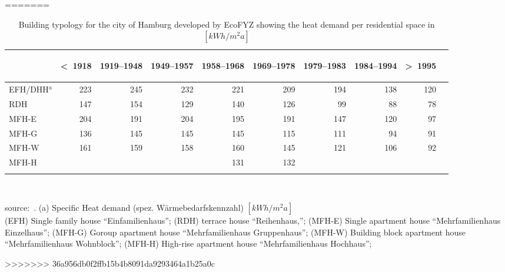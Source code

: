 =======
\begin{table}[htbp]
  \centering
  \caption{Building typology for the city of Hamburg developed by EcoFYZ
      showing the heat demand per residential space in
  $[kWh/m^2a]$}\label{tab:EcoFYZ}%
  \begin{tabular}{l r rrr rrr rr}
    \addlinespace
    \toprule
    &
    \begin{sideways}\textless~1918\end{sideways}&  %
    \begin{sideways}1919--1948\end{sideways}&     %
    \begin{sideways}1949--1957\end{sideways}&     %
    \begin{sideways}1958--1968\end{sideways}&     %
    \begin{sideways}1969--1978\end{sideways}&     %
    \begin{sideways}1979--1983\end{sideways}&     %
    \begin{sideways}1984--1994\end{sideways}&     %
    \begin{sideways}\textgreater~1995\end{sideways}\\    %
    \midrule
EFH/DHH$^a$  &223 & 245 & 232& 221& 209& 194& 138& 120\\
RDH          &147 & 154 & 129& 140& 126& 99 & 88 & 78\\
MFH-E        &204 & 191 & 204& 195& 191& 147& 120& 97\\
MFH-G        &136 & 145 & 145& 145& 115& 111& 94 & 91\\
MFH-W  	  &161 & 159 & 158& 160& 145& 121& 106& 92\\
MFH-H        &    &     &    & 131& 132\\
    \bottomrule
    \addlinespace
    \end{tabular}\\
    \begin{footnotesize}
        source:~\cite[pp.~18]{Hermelink.2011}.
    (a) Specific Heat demand (spez. W\"armebedarfskennzahl)
    $[kWh/m^{2}a]$\\
(EFH) Single family house ``Einfamilienhaus'';
(RDH) terrace house ``Reihenhaus,'';
(MFH-E) Single apartment house ``Mehrfamilienhaus Einzelhaus'';
(MFH-G) Goroup apartment house ``Mehrfamilienhaus Gruppenhaus'';
(MFH-W) Building block apartment house ``Mehrfamilienhaus Wohnblock'';
(MFH-H) High-rise apartment house ``Mehrfamilienhaus Hochhaus'';
    \end{footnotesize}
\end{table}
>>>>>>> 36a956db0f2ffb15b4b8091da9293464a1b25a0c
